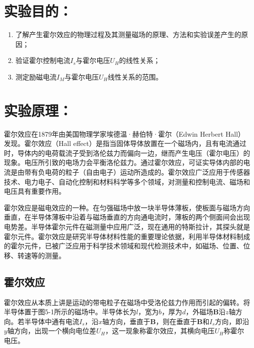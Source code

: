 
\section{实验目的：}
\begin{enumerate}[label=\arabic* 、, leftmargin=4em, labelsep=0pt]
    \item 了解产生霍尔效应的物理过程及其测量磁场的原理、方法和实验误差产生的原因；
    \item 验证霍尔控制电流$I_s$与霍尔电压$U_H$的线性关系；
    \item 测定励磁电流$I_M$与霍尔电压$U_H$线性关系的范围。
\end{enumerate}

\section{实验原理：}

霍尔效应在1879年由美国物理学家埃德温·赫伯特·霍尔（Edwin Herbert Hall）发现。霍尔效应（Hall effect）是指当固体导体放置在一个磁场内，且有电流通过时，导体内的电荷载流子受到洛伦兹力而偏向一边，继而产生电压（霍尔电压）的现象。电压所引致的电场力会平衡洛伦兹力。通过霍尔效应，可证实导体内部的电流是由带有负电荷的粒子（自由电子）运动所造成的。霍尔效应广泛应用于传感器技术、电力电子、自动化控制和材料科学等多个领域，对测量和控制电流、磁场和电压具有重要作用。

霍尔效应是磁电效应的一种。在匀强磁场中放一块半导体薄板，使板面与磁场方向垂直，在半导体薄板中沿着与磁场垂直的方向通电流时，薄板的两个侧面间会出现电势差。半导体霍尔元件在磁测量中应用广泛，现在通用的特斯拉计，其探头就是霍尔元件。霍尔效应是研究半导体材料性能的重要理论依据，利用半导体材料制成的霍尔元件，已被广泛应用于科学技术领域和现代检测技术中，如磁场、位置、位移、转速等的测量。

\subsection{霍尔效应}

霍尔效应从本质上讲是运动的带电粒子在磁场中受洛伦兹力作用而引起的偏转。将半导体置于图5-1所示的磁场中。半导体长为$l$，宽为$b$，厚为$d$，外磁场$\mathbf{B}$沿$z$轴方向。若半导体中通有电流$I_s$，沿$x$轴方向，垂直于$\mathbf{B}$，则在垂直于$\mathbf{B}$和$I_s$方向，即沿$y$轴方向，出现一个横向电位差$U_H$，这一现象称霍尔效应，其横向电压$U_H$称霍尔电压。


